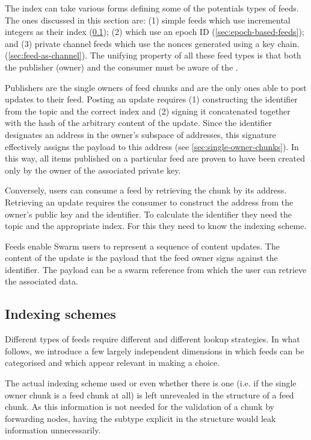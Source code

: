 The index can take various forms defining some of the potentials types of feeds. The ones discussed in this section are: (1) simple feeds which use incremental integers as their index (\ref{sec:indexing-schemes}); (2)   which use an epoch ID (\ref{sec:epoch-based-feeds}); and (3) private channel feeds which use the nonces generated using a  key chain.  (\ref{sec:feed-as-channel}).
The unifying property of all these feed types is that both the publisher (owner) and the consumer must be aware of the . 

Publishers are the single owners of feed chunks and are the only ones able to post updates to their feed. Posting an update requires (1) constructing the identifier from the topic and the correct index and (2) signing it concatenated together with the hash of the arbitrary content of the update. Since the identifier designates an address in the owner's subspace of addresses, this signature effectively assigns the payload to this address (see \ref{sec:single-owner-chunks}). In this way, all items published on a particular feed are proven to have been created only by the owner of the associated private key.

Conversely, users can consume a feed by retrieving the chunk by its address. Retrieving an update requires the consumer to construct the address from the owner's public key and the identifier. To calculate the identifier they need the topic and the appropriate index. For this they need to know the indexing scheme. 

Feeds enable Swarm users to represent a sequence of content updates. The content of the update is the payload that the feed owner signs against the identifier. The payload can be a swarm reference from which the user can retrieve the associated data.

\subsection{Indexing schemes \statusyellow}\label{sec:indexing-schemes}

Different types of feeds require different  and different lookup strategies. In what follows, we introduce a few largely independent dimensions in which feeds can be categorised and which appear relevant in making a choice.


The actual indexing scheme used or even whether there is one (i.e. if the single owner chunk is a feed chunk at all) is left unrevealed in the structure of a feed chunk. As this information is not needed for the validation of a chunk by forwarding nodes, having the subtype explicit in the structure would leak  information unnecessarily. 


